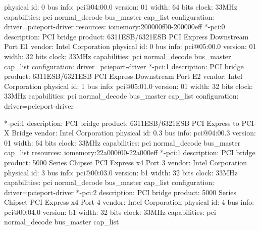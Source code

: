 \documentclass[mingoth,a4paper]{jsarticle}
\begin{document}
{{{{{{{{{{{{{{{{{{\begin{commandline}
                physical id: 0
                bus info: pci@04:00.0
                version: 01
                width: 64 bits
                clock: 33MHz
                capabilities: pci normal_decode bus_master cap_list
                configuration: driver=pcieport-driver
                resources: iomemory:200000f00-200000eff
              *-pci:0
                   description: PCI bridge
                   product: 6311ESB/6321ESB PCI Express Downstream Port E1
                   vendor: Intel Corporation
                   physical id: 0
                   bus info: pci@05:00.0
                   version: 01
                   width: 32 bits
                   clock: 33MHz
                   capabilities: pci normal_decode bus_master cap_list
                   configuration: driver=pcieport-driver
              *-pci:1
                   description: PCI bridge
                   product: 6311ESB/6321ESB PCI Express Downstream Port E2
                   vendor: Intel Corporation
                   physical id: 1
                   bus info: pci@05:01.0
                   version: 01
                   width: 32 bits
                   clock: 33MHz
                   capabilities: pci normal_decode bus_master cap_list
                   configuration: driver=pcieport-driver
\end{commandline}
\begin{commandline}
           *-pci:1
                description: PCI bridge
                product: 6311ESB/6321ESB PCI Express to PCI-X Bridge
                vendor: Intel Corporation
                physical id: 0.3
                bus info: pci@04:00.3
                version: 01
                width: 64 bits
                clock: 33MHz
                capabilities: pci normal_decode bus_master cap_list
                resources: iomemory:22a000f00-22a000eff
        *-pci:1
             description: PCI bridge
             product: 5000 Series Chipset PCI Express x4 Port 3
             vendor: Intel Corporation
             physical id: 3
             bus info: pci@00:03.0
             version: b1
             width: 32 bits
             clock: 33MHz
             capabilities: pci normal_decode bus_master cap_list
             configuration: driver=pcieport-driver
        *-pci:2
             description: PCI bridge
             product: 5000 Series Chipset PCI Express x4 Port 4
             vendor: Intel Corporation
             physical id: 4
             bus info: pci@00:04.0
             version: b1
             width: 32 bits
             clock: 33MHz
             capabilities: pci normal_decode bus_master cap_list

\end{commandline}}}}}}}}}}}}}}}}}}}
\end{document}

